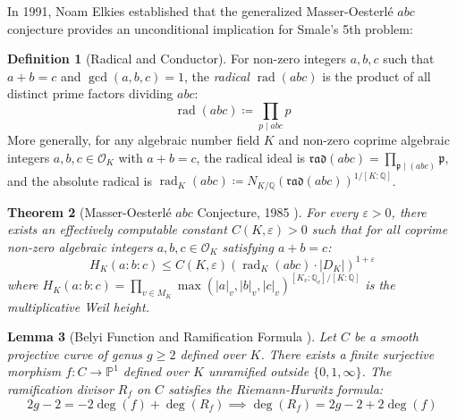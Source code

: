 \documentclass[11pt,a4paper]{article}
\newtheorem{theorem}{Theorem}[section]
\newtheorem{lemma}[theorem]{Lemma}
\theoremstyle{definition}
\newtheorem{definition}[theorem]{Definition}
\begin{document}
In 1991, Noam Elkies \cite{elkies1991} established that the generalized Masser-Oesterlé $abc$ conjecture provides an unconditional implication for Smale's 5th problem:

\begin{definition}[Radical and Conductor]\label{def:radical}
For non-zero integers $a, b, c$ such that $a + b = c$ and $\gcd(a, b, c) = 1$, the \emph{radical} $\operatorname{rad}(abc)$ is the product of all distinct prime factors dividing $abc$:
\begin{equation}\label{eq:rad_def}
\operatorname{rad}(abc) \coloneqq \prod_{p \mid abc} p
\end{equation}
More generally, for any algebraic number field $K$ and non-zero coprime algebraic integers $a, b, c \in \mathcal{O}_K$ with $a + b = c$, the radical ideal is $\mathfrak{rad}(abc) = \prod_{\mathfrak{p} \mid (abc)} \mathfrak{p}$, and the absolute radical is $\operatorname{rad}_K(abc) \coloneqq N_{K/\mathbb{Q}}(\mathfrak{rad}(abc))^{1/[K:\mathbb{Q}]}$.
\end{definition}

\begin{theorem}[Masser-Oesterlé $abc$ Conjecture, 1985 \cite{oesterle1988, masser1985}]\label{thm:abc_conj}
For every $\varepsilon > 0$, there exists an effectively computable constant $C(K, \varepsilon) > 0$ such that for all coprime non-zero algebraic integers $a, b, c \in \mathcal{O}_K$ satisfying $a + b = c$:
\begin{equation}\label{eq:abc_ineq}
H_K(a : b : c) \le C(K, \varepsilon) \left( \operatorname{rad}_K(abc) \cdot |D_K| \right)^{1 + \varepsilon}
\end{equation}
where $H_K(a : b : c) = \prod_{v \in M_K} \max(|a|_v, |b|_v, |c|_v)^{[K_v:\mathbb{Q}_v]/[K:\mathbb{Q}]}$ is the multiplicative Weil height.
\end{theorem}

\begin{lemma}[Belyi Function and Ramification Formula \cite{belyi1979}]\label{lem:belyi}
Let $C$ be a smooth projective curve of genus $g \ge 2$ defined over $K$. There exists a finite surjective morphism $f: C \to \mathbb{P}^1$ defined over $K$ unramified outside $\{0, 1, \infty\}$.
The ramification divisor $R_f$ on $C$ satisfies the Riemann-Hurwitz formula:
\begin{equation}\label{eq:riemann_hurwitz}
2g - 2 = -2 \deg(f) + \deg(R_f) \implies \deg(R_f) = 2g - 2 + 2 \deg(f)
\end{equation}
\end{lemma}
\end{document}
